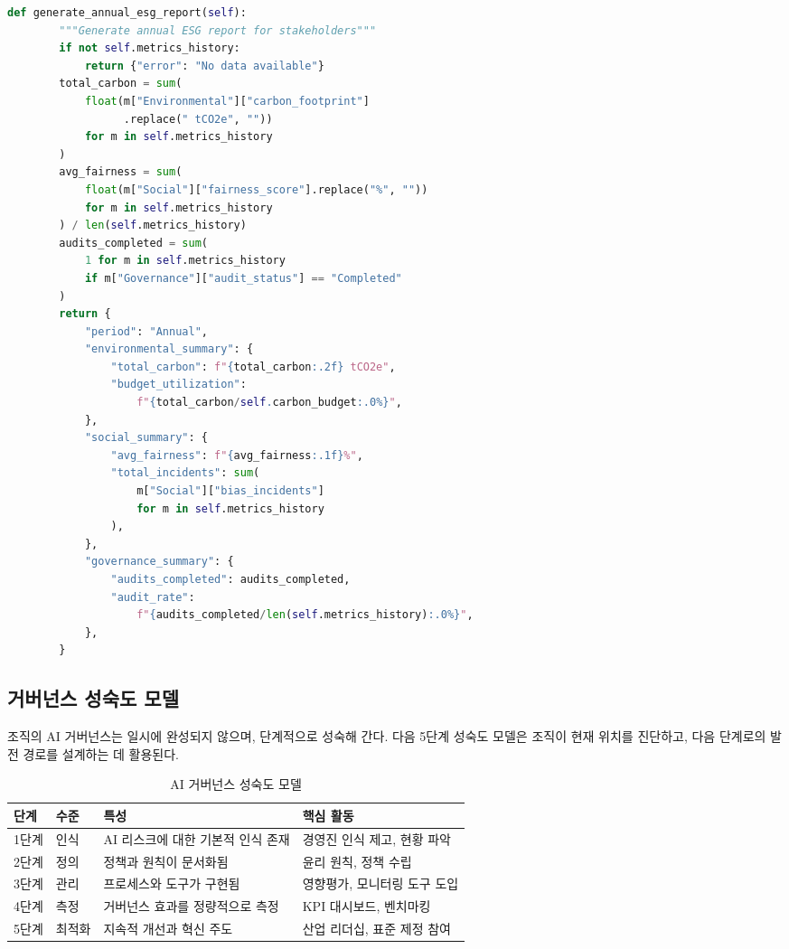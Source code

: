 \begin{lstlisting}[language=Python, caption={AI-ESG 통합 지표 관리}, label={lst:ai_esg}]
    def generate_annual_esg_report(self):
        """Generate annual ESG report for stakeholders"""
        if not self.metrics_history:
            return {"error": "No data available"}
        total_carbon = sum(
            float(m["Environmental"]["carbon_footprint"]
                  .replace(" tCO2e", ""))
            for m in self.metrics_history
        )
        avg_fairness = sum(
            float(m["Social"]["fairness_score"].replace("%", ""))
            for m in self.metrics_history
        ) / len(self.metrics_history)
        audits_completed = sum(
            1 for m in self.metrics_history
            if m["Governance"]["audit_status"] == "Completed"
        )
        return {
            "period": "Annual",
            "environmental_summary": {
                "total_carbon": f"{total_carbon:.2f} tCO2e",
                "budget_utilization":
                    f"{total_carbon/self.carbon_budget:.0%}",
            },
            "social_summary": {
                "avg_fairness": f"{avg_fairness:.1f}%",
                "total_incidents": sum(
                    m["Social"]["bias_incidents"]
                    for m in self.metrics_history
                ),
            },
            "governance_summary": {
                "audits_completed": audits_completed,
                "audit_rate":
                    f"{audits_completed/len(self.metrics_history):.0%}",
            },
        }
\end{lstlisting}

\subsection{거버넌스 성숙도 모델}
\label{sec:20.3.2}

조직의 AI 거버넌스는 일시에 완성되지 않으며, 단계적으로 성숙해 간다. 다음 5단계 성숙도 모델은 조직이 현재 위치를 진단하고, 다음 단계로의 발전 경로를 설계하는 데 활용된다.

\begin{table}[htbp]
\centering
\caption{AI 거버넌스 성숙도 모델}
\label{tab:20_maturity}
\begin{tabularx}{\textwidth}{p{1.5cm}p{2cm}Xp{4cm}}
\toprule
\textbf{단계} & \textbf{수준} & \textbf{특성} & \textbf{핵심 활동} \\
\midrule
1단계 & 인식 & AI 리스크에 대한 기본적 인식 존재 & 경영진 인식 제고, 현황 파악 \\
2단계 & 정의 & 정책과 원칙이 문서화됨 & 윤리 원칙, 정책 수립 \\
3단계 & 관리 & 프로세스와 도구가 구현됨 & 영향평가, 모니터링 도구 도입 \\
4단계 & 측정 & 거버넌스 효과를 정량적으로 측정 & KPI\cite{shankar2022operationalizing} 대시보드, 벤치마킹 \\
5단계 & 최적화 & 지속적 개선과 혁신 주도 & 산업 리더십, 표준 제정 참여 \\
\bottomrule
\end{tabularx}
\end{table}

